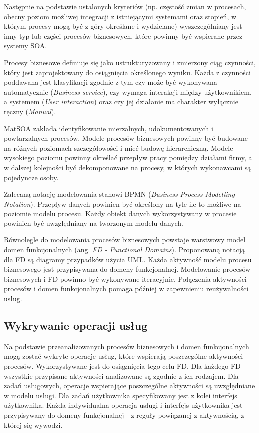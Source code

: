 Następnie na podstawie ustalonych kryteriów (np. częstość zmian w procesach, obecny poziom możliwej integracji z istniejącymi systemami oraz stopień, w którym procesy mogą być z góry określane i wydzielane) wyszczególniany jest inny typ lub części procesów biznesowych, które powinny być wspierane przez systemy SOA.

Procesy biznesowe definiuje się jako ustrukturyzowany i zmierzony ciąg czynności, który jest zaprojektowany do osiągnięcia określonego wyniku\cite{PlatIntGor}. Każda z czynności poddawana jest klasyfikacji zgodnie z tym czy może być wykonywana automatycznie (\emph{Business service}), czy wymaga interakcji między użytkownikiem, a systemem (\emph{User interaction}) oraz czy jej działanie ma charakter wyłącznie ręczny (\emph{Manual}).

MatSOA zakłada identyfikowanie mierzalnych, udokumentowanych i powtarzalnych procesów. Modele procesów biznesowych powinny być budowane na różnych poziomach szczegółowości i mieć budowę hierarchiczną. Modele wysokiego poziomu powinny określać przepływ pracy pomiędzy działami firmy, a w dalszej kolejności być dekomponowane na procesy, w których wykonawcami są pojedyncze osoby. 

Zalecaną notację modelowania stanowi BPMN (\emph{Business Process Modelling Notation}). Przepływ danych powinien być określony na tyle ile to możliwe na poziomie modelu procesu. Każdy obiekt danych wykorzystywany w procesie powinien być uwzględniany na tworzonym modelu danych.

Równolegle do modelowania procesów biznesowych powstaje warstwowy model domen funkcjonalnych (ang. \emph{FD - Functional Domains}). Proponowaną notacją dla FD są diagramy przypadków użycia UML. Każda aktywność modelu procesu biznesowego jest przypisywana do domeny funkcjonalnej. Modelowanie procesów biznesowych i FD powinno być wykonywane iteracyjnie. Połączenia aktywności procesów i domen funkcjonalnych pomaga później w zapewnieniu reużywalności usług.

\subsection*{Wykrywanie operacji usług}
Na podstawie przeanalizowanych procesów biznesowych i domen funkcjonalnych mogą zostać wykryte operacje usług, które wspierają poszczególne aktywności procesów. Wykorzystywane jest do osiągnięcia tego celu FD. Dla każdego FD wszystkie przypisane aktywności analizowane są zgodnie z ich rodzajem. Dla zadań usługowych, operacje wspierające poszczególne aktywności są uwzględniane w modelu usługi. Dla zadań użytkownika specyfikowany jest z kolei interfejs użytkownika. Każda indywidualna operacja usługi i interfejs użytkownika jest przypisywany do domeny funkcjonalnej - z reguły powiązanej z aktywnością, z której się wywodzi.

